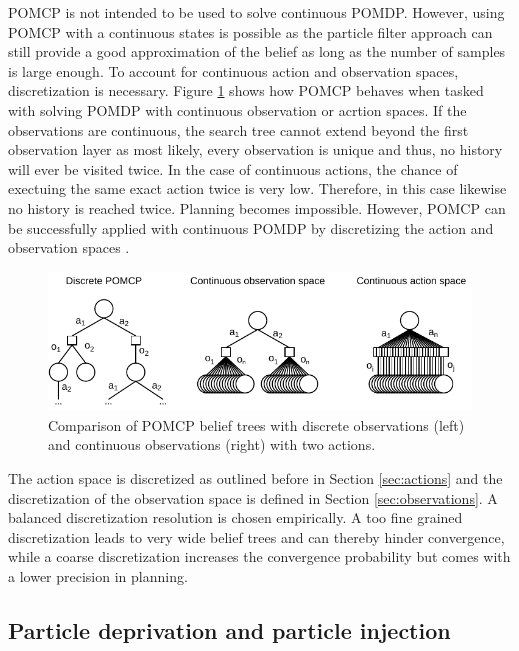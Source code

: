 POMCP is not intended to be used to solve continuous POMDP. However, using POMCP with a continuous states is possible as the particle filter approach can still provide a good approximation of the belief as long as the number of samples is large enough. To account for continuous action and observation spaces, discretization is necessary. Figure \ref{fig:pomcp_cont} shows how POMCP behaves when tasked with solving POMDP with continuous observation or acrtion spaces. If the observations are continuous, the search tree cannot extend beyond the first observation layer as most likely, every observation is unique and thus, no history will ever be visited twice. In the case of continuous actions, the chance of exectuing the same exact action twice is very low. Therefore, in this case likewise no history is reached twice. Planning becomes impossible. However, POMCP can be successfully applied with continuous POMDP by discretizing the action and observation spaces \parencite{pomcp_continuous}.

\begin{figure}[htbp]
    \centering
    \includegraphics[width=1.0\textwidth]{figures/pomcp_continuous.pdf}
    \caption[Comparison of POMCP belief trees with discrete observations and continuous observations]{Comparison of POMCP belief trees with discrete observations (left) and continuous observations (right) with two actions.}
    \label{fig:pomcp_cont}
\end{figure}

The action space is discretized as outlined before in Section \ref{sec:actions} and the discretization of the observation space is defined in Section \ref{sec:observations}. A balanced discretization resolution is chosen empirically. A too fine grained discretization leads to very wide belief trees and can thereby hinder convergence, while a coarse discretization increases the convergence probability but comes with a lower precision in planning.



\subsection{Particle deprivation and particle injection}
\label{sec:particle_deprivation}

